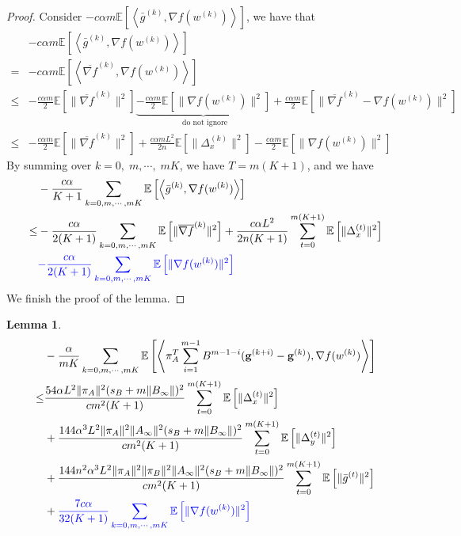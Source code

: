 \documentclass{article}
\newtheorem{lemma}[thm]{Lemma}
\newcommand{\vg}{{\mathbf{g}}}
\newcommand{\EE}[1]{\mathbb{E}\left[#1\right]}
\newcommand{\norm}[1]{\| #1 \|}
\newcommand{\ip}[1]{\left\langle#1\right\rangle}
\begin{document}
\begin{proof}
  Consider $-c\alpha m \EE{\ip{\bar{g}^{(k)},\nabla f(w^{(k)})}}$, we have that 
  \begin{align*}
    &-c\alpha m \EE{\ip{\bar{g}^{(k)},\nabla f(w^{(k)})}}\\=&-c\alpha m \EE{\ip{\overline{\nabla f}^{(k)},\nabla f(w^{(k)})}}\\ \leq & -\frac{c\alpha m}{2}\EE{\norm{\overline{\nabla f}^{(k)}}^2}\underbrace{-\frac{c\alpha m}{2}\EE{\norm{\nabla f(w^{(k)})}^2}}_{\text{ do not ignore}}+\frac{c\alpha m}{2}\EE{\norm{\overline{\nabla f}^{(k)}-\nabla f(w^{(k)})}^2}\\ \leq &-\frac{c\alpha m}{2}\EE{\norm{\overline{\nabla f}^{(k)}}^2}+\frac{c\alpha mL^2}{2n}\EE{\norm{\Delta_x^{(k)}}^2}-\frac{c\alpha m}{2}\EE{\norm{\nabla f(w^{(k)})}^2}
  \end{align*}
  By summing over $k=0,\;m,\cdots,\;mK$, we have $T=m(K+1)$, and we have
  \begin{align*}
    &-\frac{c\alpha }{K+1} \sum_{k=0,m,\cdots,mK}\EE{\ip{\bar{g}^{(k)},\nabla f(w^{(k)})}}\\\leq& -\frac{c\alpha }{2(K+1)}\sum_{k=0,m,\cdots,mK}\EE{\norm{\overline{\nabla f}^{(k)}}^2}+\frac{c\alpha L^2}{2n(K+1)}\sum_{t=0}^{m(K+1)}\EE{\norm{\Delta_x^{(t)}}^2}\\&\textcolor{blue}{-\frac{c\alpha}{2(K+1)}\sum_{k=0,m,\cdots,mK}\EE{\norm{\nabla f(w^{(k)})}^2}}
  \end{align*}
  We finish the proof of the lemma.
\end{proof}

\begin{lemma}\label{Convergence Analysis: Inner Product Term-3}
    \begin{align*}
    &-\frac{\alpha}{mK}\sum_{k=0,m,\cdots,mK}\EE{\ip{\pi_A^T\sum_{i=1}^{m-1}B^{m-1-i}(\vg^{(k+i)}-\vg^{(k)}),\nabla f(w^{(k)})}}\\ 
    \leq&\frac{54\alpha L^2\norm{\pi_A}^2(s_B+m\norm{B_{\infty}})^2}{cm^2(K+1)}\sum_{t=0}^{m(K+1)}\EE{\norm{\Delta_x^{(t)}}^2}\\&+\frac{144\alpha^3L^2\norm{\pi_A}^2\norm{A_{\infty}}^2(s_B+m\norm{B_{\infty}})^2}{cm^2(K+1)}\sum_{t=0}^{m(K+1)}\EE{\norm{\Delta_y^{(t)}}^2}
    \\&+\frac{144n^2\alpha^3L^2\norm{\pi_A}^2\norm{\pi_B}^2\norm{A_{\infty}}^2(s_B+m\norm{B_{\infty}})^2}{cm^2(K+1)}\sum_{t=0}^{m(K+1)}\EE{\norm{\bar{g}^{(t)}}^2}\\&+\textcolor{blue}{\frac{7c\alpha}{32(K+1)}\sum_{k=0,m,\cdots,mK}\EE{\norm{\nabla f(w^{(k)})}^2}}
  \end{align*}
\end{lemma}
\end{document}
